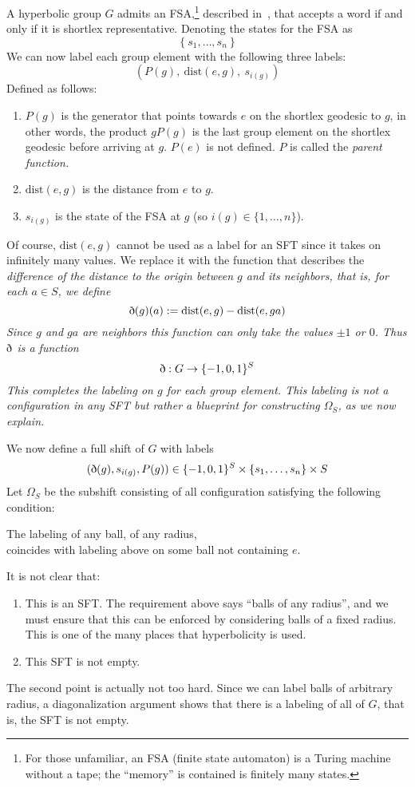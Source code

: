 \documentclass[12pt,reqno]{amsart}
\theoremstyle{plain}
\theoremstyle{definition}
\numberwithin{subcase}{case}
\theoremstyle{plain}
\theoremstyle{definition}
\begin{document}
A hyperbolic group \(G\) admits an FSA,\footnote{For those unfamiliar, an FSA (finite state automaton) is a Turing machine without a tape; the ``memory'' is contained is finitely many states.}
described in~\cite{book},
that accepts a word if and only if it is shortlex representative. Denoting the states for the FSA as 
\[
\left\{
s_{1},\dots,s_{n}
\right\}
\]  
We can now label each group element with the following three labels:
\[
\left(
P(g), \ \mathrm{dist}(e,g), \ s_{i(g)}
\right)
\]
Defined as follows:
\begin{enumerate}
\item \(P(g)\) is the generator that points towards \(e\) on the shortlex geodesic to \(g\), in other words, the product \(gP(g)\) is the last group element on the shortlex geodesic before arriving at \(g\). \(P(e)\) is not defined. \(P\) is called the \em parent function\em.

\item \(\mathrm{dist}(e,g)\) is the distance from \(e\) to \(g\).  

\item \(s_{i(g)}\) is the state of the FSA at \(g\) (so \(i(g) \in \{1,\dots,n\}\)).
\end{enumerate}
Of course, \(\mathrm{dist}(e,g)\) cannot be used as a label for an SFT since it takes on infinitely many values. We replace it with the function that describes the \em difference \em of the distance to the origin between \(g\) and its neighbors, that is, for each \(a \in S\), we define
\[
\textrm{\dh}(g)(a) := 
\mathrm{dist}(e,g) -  \mathrm{dist}(e,ga)
\]
Since \(g\) and \(ga\) are neighbors this function can only take the values \(\pm 1\) or \(0\). Thus \(\textrm{\dh}\) is a function
\[
\textrm{\dh}: G \to
\{-1,0,1\}^{S}
\]
This completes the labeling on \(g\) for each group element. This labeling is \em not \em a configuration in any SFT but rather a blueprint for constructing \(\Omega_{S}\), as we now explain.

\bigskip\noindent
We now define a full shift of \(G\) with labels
\begin{equation}
\label{labels_shellings}
(\textrm{\dh}(g) ,s_{i(g)},P(g))
\in
\{-1,0,1\}^{S} \times \{s_1,\dots,s_{n}\} \times S
\end{equation}
Let \(\Omega_{S}\) be the subshift consisting of all configuration satisfying the following condition:
\begin{center}
The labeling of any ball, of any radius, \\ 
coincides with labeling above on some ball not containing \(e\).
\end{center}
It is not clear that:
\begin{enumerate}
\item This is an SFT. The requirement above says ``balls of any radius'', and we must ensure that this can be enforced by considering balls of a fixed radius. This is one of the many places that hyperbolicity is used.
\item This SFT is not empty.
\end{enumerate}
The second point is actually not too hard. Since we can label balls of arbitrary radius, a diagonalization argument shows that there is a labeling of all of \(G\), that is, the SFT is not empty.
\end{document}
